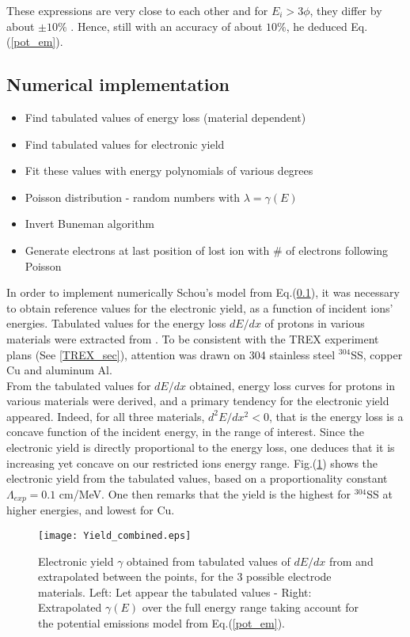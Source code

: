 These expressions are very close to each other and for $E_i>3 \phi$, they differ by  about $\pm 10 \%$ \cite{kishi73}. Hence, still with an accuracy of about $10\%$, he deduced Eq.(\ref{pot_em}).


\subsection{Numerical implementation}
\begin{itemize}
\item{Find tabulated values of energy loss (material dependent)}
\item{Find tabulated values for electronic yield}
\item{Fit these values with energy polynomials of various degrees}
\item{Poisson distribution - random numbers with $\lambda=\gamma(E)$}
\item{Invert Buneman algorithm}
\item{Generate electrons at last position of lost ion with \# of electrons following Poisson}
\end{itemize}



In order to implement numerically Schou's model from Eq.(\ref{}), it was necessary to obtain reference values for the electronic yield, as a function of incident ions' energies. Tabulated values for the energy loss $dE/dx$ of protons in various materials were extracted from \cite{Janni_vol1, Janni_vol2}. To be consistent with the TREX experiment plans (See \ref{TREX_sec}), attention was drawn on 304 stainless steel $^{304}$SS, copper Cu and aluminum Al.\\

\noindent From the tabulated values for $dE/dx$ obtained, energy loss curves for protons in various materials were derived, and a primary tendency for the electronic yield appeared. Indeed, for all three materials, $d^2E/dx^2<0$, that is the energy loss is a concave function of the incident energy, in the range of interest. Since the electronic yield is directly proportional to the energy loss, one deduces that it is increasing yet concave on our restricted ions energy range. Fig.(\ref{yield}) shows the electronic yield from the tabulated values, based on a proportionality constant $\Lambda_{exp}=0.1$ cm/MeV. One then remarks that the yield is the highest for $^{304}$SS at higher energies, and lowest for Cu. 

\begin{figure}[h!]
\centering
	\texttt{[image: Yield\_combined.eps]}
	\caption{\label{yield} Electronic yield $\gamma$ obtained from tabulated values of $dE/dx$ from \cite{Janni_vol1, Janni_vol2} and extrapolated between the points, for the 3 possible electrode materials. Left: Let appear the tabulated values - Right: Extrapolated $\gamma(E)$ over the full energy range taking account for the potential emissions model from Eq.(\ref{pot_em}).}
\end{figure}  

